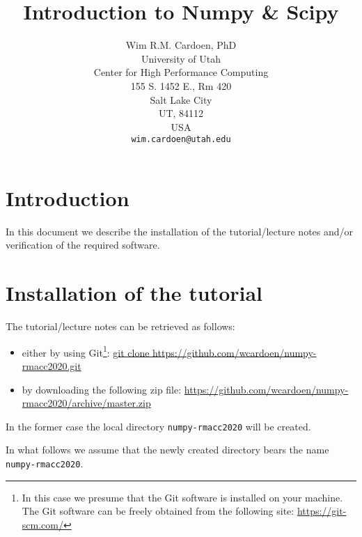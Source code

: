 \documentclass[11pt]{article}
\begin{document}
\title{Introduction to Numpy \& Scipy}
\author{Wim R.M. Cardoen, PhD\\
        University of Utah\\
        Center for High Performance Computing\\
        155 S. 1452 E., Rm 420\\
        Salt Lake City\\
        UT, 84112\\
        USA\\
        \texttt{wim.cardoen@utah.edu}}
\renewcommand{\today}{May 19, 2020}
\renewcommand{\labelitemii}{$\star$}
\maketitle

\section*{Introduction}
In this document we describe the installation of the tutorial/lecture notes 
and/or verification of the required software.

\renewcommand \thesection{\Roman{section}}
\section{Installation of the tutorial}
The tutorial/lecture notes can be retrieved as follows:
\begin{itemize}
\item either by using Git\footnote{In this case we presume that the Git software is installed on your machine. 
	The Git software can be freely obtained from the following site: \href{https://git-scm.com/}{https://git-scm.com/}}:\newline
      \href{git clone https://github.com/wcardoen/numpy-rmacc2020.git}{git clone https://github.com/wcardoen/numpy-rmacc2020.git}
\item by downloading the following zip file:\newline
	\href{https://github.com/wcardoen/numpy-rmacc2020/archive/master.zip}{https://github.com/wcardoen/numpy-rmacc2020/archive/master.zip}
\end{itemize}
In the former case the local directory \texttt{numpy-rmacc2020} 
will be created. 

In what follows we assume that the newly created directory bears the name \texttt{numpy-rmacc2020}.  
\end{document}
